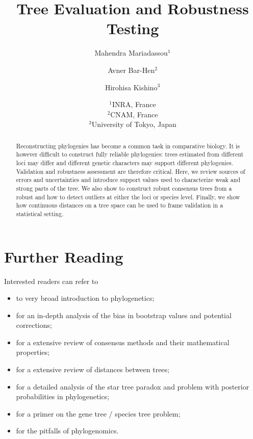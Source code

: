 \documentclass[a4paper,12pt]{article}
\title{Tree Evaluation and Robustness Testing}
\author{Mahendra Mariadassou$^1$ \and Avner Bar-Hen$^2$ \and Hirohisa Kishino$^3$}
\date{%
$^1$INRA, France\\%
$^2$CNAM, France\\%
$^3$University of Tokyo, Japan%
}
\begin{document}

\maketitle

\begin{abstract}
Reconstructing phylogenies has become a common task in comparative biology. It is however difficult to construct fully reliable phylogenies: trees estimated from different loci may differ and different genetic characters may support different phylogenies. Validation and robustness assessment are therefore critical. Here, we review sources of errors and uncertainties and introduce support values used to characterize weak and strong parts of the tree. We also show to construct robust consensus trees from a robust and how to detect outliers at either the loci or species level. Finally, we show how continuous distances on a tree space can be used to frame validation in a statistical setting.
\end{abstract}

\tableofcontents







% 


\section{Further Reading}

Interested readers can refer to 
\begin{itemize}
 \item \citet{Felsenstein2004} to very broad introduction to phylogenetics;
 \item \citet{Susko2010} for an in-depth analysis of the bias in bootstrap values and potential corrections;
 \item \citet{Bryant2003} for a extensive review of consensus methods and their mathematical properties;
 \item \citet{St.John2017} for a extensive review of distances between trees;
 \item \citet{Yang2007} for a detailed analysis of the star tree paradox and problem with posterior probabilities in phylogenetics;
 \item \citet{Degnan2009} for a primer on the gene tree / species tree problem;
 \item \citet{philippe2017pitfalls} for the pitfalls of phylogenomics.
\end{itemize}




\end{document}
